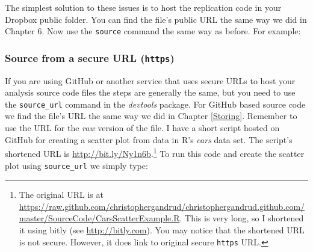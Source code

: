 \documentclass[ChapterTOCs,krantz1]{krantz}\usepackage{graphicx, color}
\begin{document}
The simplest solution to these issues is to host the replication code in your Dropbox public folder. You can find the file's public URL the same way we did in Chapter 6. Now use the \texttt{source} command the same way as before. For example:

\subsubsection{Source from a secure URL (\texttt{https})}

If you are using GitHub or another service that uses secure URLs to host your analysis source code files the steps are generally the same, but you need to use the \texttt{source\_url} command in the {\emph{devtools}} package. For GitHub based source code we find the file's URL the same way we did in Chapter \ref{Storing}. Remember to use the URL for the {\emph{raw}} version of the file. I have a short script hosted on GitHub for creating a scatter plot from data in R's {\emph{cars}} data set. The script's shortened URL is \url{http://bit.ly/Ny1n6b}.\footnote{The original URL is at \url{https://raw.github.com/christophergandrud/christophergandrud.github.com/master/SourceCode/CarsScatterExample.R}. This is very long, so I shortened it using bitly (see \url{http://bitly.com}). You may notice that the shortened URL is not secure. However, it does link to original secure {\tt{https}} URL.} To run this code and create the scatter plot using {\tt{source\_url}} we simply type:
\end{document}
